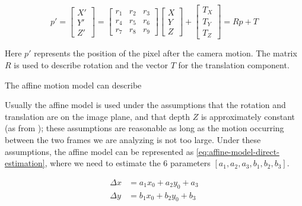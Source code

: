 \begin{equation}
    \label{eq:affine-model-representation}
    p' = 
    \begin{bmatrix}
        X' \\ Y' \\ Z'
    \end{bmatrix}
    =
    \begin{bmatrix}
        r_1 & r_2 & r_3 \\
        r_4 & r_5 & r_6 \\
        r_7 & r_8 & r_9 
    \end{bmatrix}
    \begin{bmatrix}
        X \\ Y \\ Z
    \end{bmatrix}
    +
    \begin{bmatrix}
        T_X \\ T_Y \\ T_Z
    \end{bmatrix}
    = Rp + T
\end{equation}


Here $p'$ represents the position of the pixel after the camera motion. The matrix $R$ is used to describe rotation and the vector $T$ for the translation component.

The affine motion model can describe

Usually the affine model is used under the assumptions that the rotation and translation are on the image plane, and that depth $Z$ is approximately constant (as from \cite{WangBook}); these assumptions are reasonable as long as the motion occurring between the two frames we are analyzing is not too large.
Under these assumptions, the affine model can be represented as \cref{eq:affine-model-direct-estimation}, where we need to estimate the 6 parameters $[a_1, a_2, a_3, b_1, b_2, b_3 ]$.

\begin{equation}
    \label{eq:affine-model-direct-estimation}
    \begin{split}
        \Delta x &= a_1 x_0 + a_2 y_0 + a_3 \\
        \Delta y &= b_1 x_0 + b_2 y_0 + b_3
    \end{split}
\end{equation}

